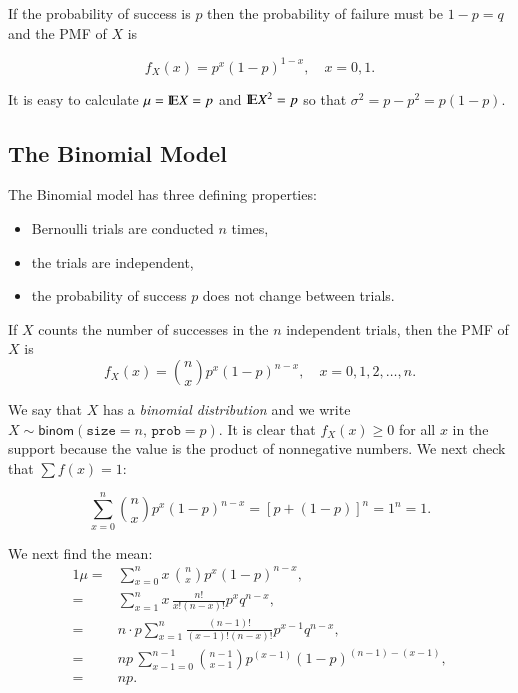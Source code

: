 \documentclass[captions=tableheading]{scrbook}
\begin{document}
If the probability of success is \(p\) then the probability of failure must be \(1-p=q\) and the PMF of \(X\) is

\begin{equation}
f_{X}(x)=p^{x}(1-p)^{1-x},\quad x=0,1.
\end{equation}

It is easy to calculate \(\mu=\mathrm{I\hspace{-1.5pt}E} X=p\) and \(\mathrm{I\hspace{-1.5pt}E} X^{2}=p\) so that \(\sigma^{2}=p-p^{2}=p(1-p)\).
\subsection{The Binomial Model}
\label{sec-1-3-1}

\label{sub:The-Binomial-Model}

The Binomial model has three defining properties:

\begin{itemize}
\item Bernoulli trials are conducted \(n\) times,
\item the trials are independent,
\item the probability of success \(p\) does not change between trials.
\end{itemize}

If \(X\) counts the number of successes in the \(n\) independent trials, then the PMF of \(X\) is 
\begin{equation}
f_{X}(x)={n \choose x}p^{x}(1-p)^{n-x},\quad x=0,1,2,\ldots,n.
\end{equation}

We say that \(X\) has a \emph{binomial distribution} and we write \(X\sim\mathsf{binom}(\mathtt{size}=n,\,\mathtt{prob}=p)\). It is clear that \(f_{X}(x)\geq0\) for all \(x\) in the support because the value is the product of nonnegative numbers. We next check that \(\sum f(x)=1\):

\[
\sum_{x=0}^{n}{n \choose x}p^{x}(1-p)^{n-x}=[p+(1-p)]^{n}=1^{n}=1.
\]

We next find the mean:
\begin{alignat*}{1}
\mu= & \sum_{x=0}^{n}x\,{n \choose x}p^{x}(1-p)^{n-x},\\
= & \sum_{x=1}^{n}x\,\frac{n!}{x!(n-x)!}p^{x}q^{n-x},\\
= & n\cdot p\sum_{x=1}^{n}\frac{(n-1)!}{(x-1)!(n-x)!}p^{x-1}q^{n-x},\\
= & np\,\sum_{x-1=0}^{n-1}{n-1 \choose x-1}p^{(x-1)}(1-p)^{(n-1)-(x-1)},\\
= & np.
\end{alignat*}
\end{document}
